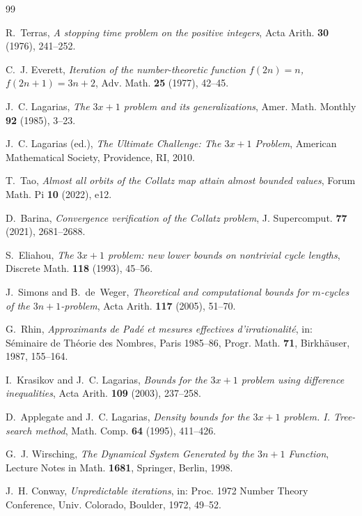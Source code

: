 \documentclass[11pt]{article}
\theoremstyle{definition}
\begin{document}
 
\begin{thebibliography}{99}
   
R.~Terras,
\emph{A stopping time problem on the positive integers},
Acta Arith. \textbf{30} (1976), 241--252.

C.~J. Everett,
\emph{Iteration of the number-theoretic function $f(2n)=n$, $f(2n+1)=3n+2$},
Adv. Math. \textbf{25} (1977), 42--45.

J.~C. Lagarias,
\emph{The $3x+1$ problem and its generalizations},
Amer. Math. Monthly \textbf{92} (1985), 3--23.

J.~C. Lagarias (ed.),
\emph{The Ultimate Challenge: The $3x+1$ Problem},
American Mathematical Society, Providence, RI, 2010.

T.~Tao,
\emph{Almost all orbits of the Collatz map attain almost bounded values},
Forum Math. Pi \textbf{10} (2022), e12.

D.~Barina,
\emph{Convergence verification of the Collatz problem},
J. Supercomput. \textbf{77} (2021), 2681--2688.

S.~Eliahou,
\emph{The $3x+1$ problem: new lower bounds on nontrivial cycle lengths},
Discrete Math. \textbf{118} (1993), 45--56.

J.~Simons and B.~de~Weger,
\emph{Theoretical and computational bounds for $m$-cycles of the $3n+1$-problem},
Acta Arith. \textbf{117} (2005), 51--70.

G.~Rhin,
\emph{Approximants de Pad\'e et mesures effectives d'irrationalit\'e},
in: S\'eminaire de Th\'eorie des Nombres, Paris 1985--86,
Progr. Math. \textbf{71}, Birkh\"auser, 1987, 155--164.

I.~Krasikov and J.~C. Lagarias,
\emph{Bounds for the $3x+1$ problem using difference inequalities},
Acta Arith. \textbf{109} (2003), 237--258.

D.~Applegate and J.~C. Lagarias,
\emph{Density bounds for the $3x+1$ problem. I. Tree-search method},
Math. Comp. \textbf{64} (1995), 411--426.

G.~J. Wirsching,
\emph{The Dynamical System Generated by the $3n+1$ Function},
Lecture Notes in Math. \textbf{1681}, Springer, Berlin, 1998.

J.~H. Conway,
\emph{Unpredictable iterations},
in: Proc. 1972 Number Theory Conference, Univ. Colorado, Boulder, 1972,
49--52.


\end{thebibliography}
\end{document}
